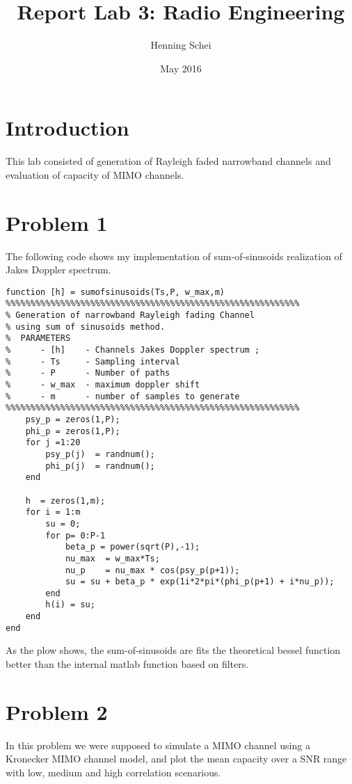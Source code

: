 \documentclass{article}
\title{Report Lab 3: Radio Engineering}
\author{Henning Schei}
\date{May 2016}
\begin{document}
\maketitle
\section{Introduction}
This lab consisted of generation of Rayleigh faded narrowband channels and evaluation of capacity of MIMO channels. 

\section {Problem 1}


The following code shows my implementation of sum-of-sinusoids realization of Jakes Doppler spectrum. 
\begin{lstlisting}
function [h] = sumofsinusoids(Ts,P, w_max,m)
%%%%%%%%%%%%%%%%%%%%%%%%%%%%%%%%%%%%%%%%%%%%%%%%%%%%%%%%%%%
% Generation of narrowband Rayleigh fading Channel
% using sum of sinusoids method. 
%  PARAMETERS
%      - [h]    - Channels Jakes Doppler spectrum ;                
%      - Ts     - Sampling interval 
%      - P      - Number of paths
%      - w_max  - maximum doppler shift
%      - m      - number of samples to generate   
%%%%%%%%%%%%%%%%%%%%%%%%%%%%%%%%%%%%%%%%%%%%%%%%%%%%%%%%%%%
    psy_p = zeros(1,P);
    phi_p = zeros(1,P);
    for j =1:20
        psy_p(j)  = randnum();
        phi_p(j)  = randnum();
    end
    
    h  = zeros(1,m);
    for i = 1:m
        su = 0;
        for p= 0:P-1
            beta_p = power(sqrt(P),-1);
            nu_max  = w_max*Ts;
            nu_p    = nu_max * cos(psy_p(p+1));
            su = su + beta_p * exp(1i*2*pi*(phi_p(p+1) + i*nu_p));
        end
        h(i) = su;
    end
end
\end{lstlisting}




As the plow shows, the sum-of-sinusoids are fits the theoretical bessel function better than the internal matlab function based on filters. 


\section{Problem 2}
In this problem we were supposed to simulate a MIMO channel using a Kronecker MIMO channel model, and plot the mean capacity over a SNR range with low, medium and high correlation scenarious. 
\end{document}
